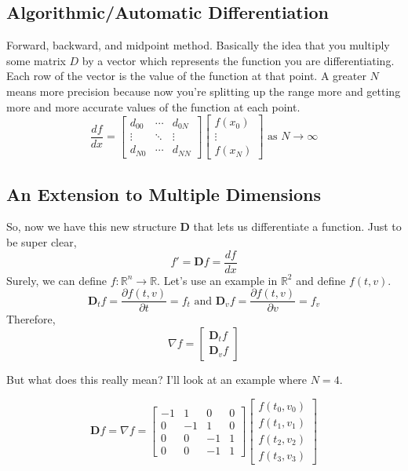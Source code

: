 \documentclass{article}
\begin{document}
\subsection {Algorithmic/Automatic Differentiation}
Forward, backward, and midpoint method.
Basically the idea that you multiply some matrix $D$ by a vector which represents the function you are differentiating. Each row of the vector is the
value of the function at that point. A greater $N$ means more precision because now you're splitting up the range more and getting more and more accurate
values of the function at each point. 
$$
\dfrac{df}{dx} = 
\begin{bmatrix}
	d_{00} & \cdots & d_{0N} \\
	\vdots & \ddots & \vdots \\
	d_{N0} & \cdots & d_{NN}
\end{bmatrix}
\begin{bmatrix}
	f(x_0) \\
	\vdots \\
	f(x_N)
\end{bmatrix}
\text{ as } N \rightarrow \infty
$$

\subsection {An Extension to Multiple Dimensions}
So, now we have this new structure $\mathbf{D}$ that lets us differentiate a function. Just to be super clear, $$f' = \mathbf{D}f = \dfrac{df}{dx}$$
Surely, we can define $f: \mathbb{R}^n \rightarrow \mathbb{R}$. Let's use an example in $\mathbb{R}^2$ and define $f(t, v)$.
$$\mathbf{D}_tf = \dfrac{\partial f(t, v)}{\partial t} = f_t \text{ and } \mathbf{D}_vf = \dfrac{\partial f(t, v)}{\partial v} = f_v$$
Therefore,
$$
\nabla f = \begin{bmatrix}
	\mathbf{D}_tf \\
	\mathbf{D}_vf
\end{bmatrix}
$$

But what does this really mean? I'll look at an example where $N = 4$.

$$
\mathbf{D}f = \nabla f = \begin{bmatrix}
	-1 &  1 &  0 & 0 \\
	 0 & -1 &  1 & 0 \\
	 0 &  0 & -1 & 1 \\
	 0 &  0 & -1 & 1
\end{bmatrix}
\begin{bmatrix}
	f(t_0, v_0) \\
	f(t_1, v_1) \\
	f(t_2, v_2) \\
	f(t_3, v_3)
\end{bmatrix}
$$
\end{document}
